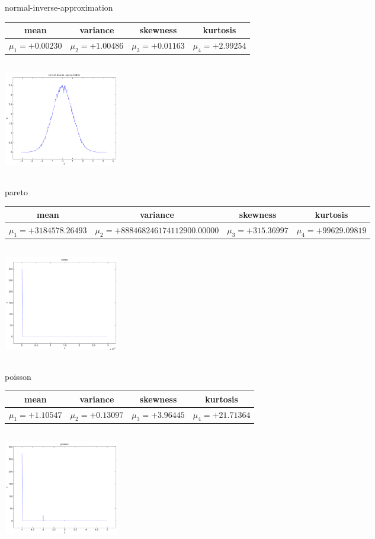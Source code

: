 \documentclass[9pt]{article}
\theoremstyle{plain}
\theoremstyle{definition}
\theoremstyle{remark}
\numberwithin{equation}{section}
\begin{document}
\newpage
normal-inverse-approximation \begin{tabular}{|c|c|c|c|}  mean & variance & skewness & kurtosis \\  \hline
$\mu_1 = +0.00230$ & $\mu_2 = +1.00486$ & $\mu_3 = +0.01163$ & $\mu_4 =+2.99254$ \\
\end{tabular}

\includegraphics[width=5cm,height=5cm]{normal-inverse-approximation.pdf}

pareto \begin{tabular}{|c|c|c|c|}  mean & variance & skewness & kurtosis \\  \hline
$\mu_1 = +3184578.26493$ & $\mu_2 = +888468246174112900.00000$ & $\mu_3 = +315.36997$ & $\mu_4 =+99629.09819$ \\
\end{tabular}

\includegraphics[width=5cm,height=5cm]{pareto.pdf}

poisson \begin{tabular}{|c|c|c|c|}  mean & variance & skewness & kurtosis \\  \hline
$\mu_1 = +1.10547$ & $\mu_2 = +0.13097$ & $\mu_3 = +3.96445$ & $\mu_4 =+21.71364$ \\
\end{tabular}

\includegraphics[width=5cm,height=5cm]{poisson.pdf}
\end{document}
